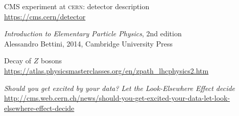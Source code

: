 \begin{thebibliography}{99}
CMS experiment at \textsc{cern}: detector description
\\\url{https://cms.cern/detector}

\textit{Introduction to Elementary Particle Physics}, 2nd edition
\\Alessandro Bettini, 2014, Cambridge University Press

Decay of $Z$ bosons
\\\url{https://atlas.physicsmasterclasses.org/en/zpath_lhcphysics2.htm}

\textit{Should you get excited by your data? Let the Look-Elsewhere Effect decide}
\\\url{http://cms.web.cern.ch/news/should-you-get-excited-your-data-let-look-elsewhere-effect-decide}
\end{thebibliography}